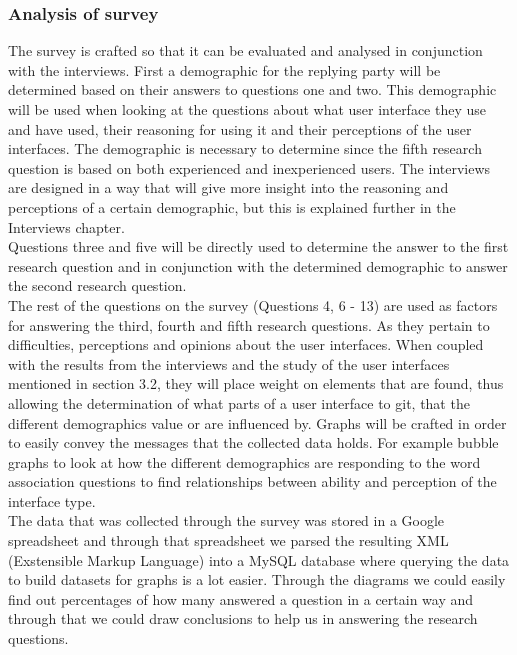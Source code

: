 \documentclass[a4paper,oneside]{bth} %
\begin{document}
					\subsubsection*{Analysis of survey}
					The survey is crafted so that it can be evaluated and analysed in conjunction with the interviews. 
					First a demographic for the replying party will be determined based on their answers to questions one and two. This demographic will be used when looking at the questions about what user interface they use and have used, their reasoning for using it and their perceptions of the user interfaces. The demographic is necessary to determine since the fifth research question is based on both experienced and inexperienced users. The interviews are designed in a way that will give more insight into the reasoning and perceptions of a certain demographic, but this is explained further in the Interviews chapter.
					\\
					Questions three and five will be directly used to determine the answer to the first research question and in conjunction with the determined demographic to answer the second research question.
					\\
					The rest of the questions on the survey (Questions 4, 6 - 13) are used as factors for answering the third, fourth and fifth research questions. As they pertain to difficulties, perceptions and opinions about the user interfaces. When coupled with the results from the interviews and the study of the user interfaces mentioned in section 3.2, they will place weight on elements that are found, thus allowing the determination of what parts of a user interface to git, that the different demographics value or are influenced by. Graphs will be crafted in order to easily convey the messages that the collected data holds. For example bubble graphs to look at how the different demographics are responding to the word association questions to find relationships between ability and perception of the interface type. 
					\\
					The data that was collected through the survey was stored in a Google spreadsheet \cite{GoogleSpreadsheet} and through that spreadsheet we parsed the resulting XML (Exstensible Markup Language) into a MySQL database where querying the data to build datasets for graphs is a lot easier.
					Through the diagrams we could easily find out percentages of how many answered a question in a certain way and through that we could draw conclusions to help us in answering the research questions.
					
\end{document}
